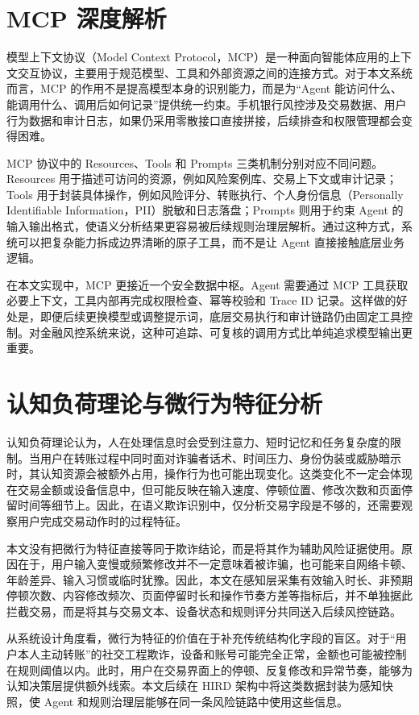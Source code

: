 \documentclass{xduugthesis}
\begin{document}
\section{MCP 深度解析}
模型上下文协议（Model Context Protocol，MCP）是一种面向智能体应用的上下文交互协议，主要用于规范模型、工具和外部资源之间的连接方式。对于本文系统而言，MCP 的作用不是提高模型本身的识别能力，而是为“Agent 能访问什么、能调用什么、调用后如何记录”提供统一约束。手机银行风控涉及交易数据、用户行为数据和审计日志，如果仍采用零散接口直接拼接，后续排查和权限管理都会变得困难。

MCP 协议中的 Resources、Tools 和 Prompts 三类机制分别对应不同问题。Resources 用于描述可访问的资源，例如风险案例库、交易上下文或审计记录；Tools 用于封装具体操作，例如风险评分、转账执行、个人身份信息（Personally Identifiable Information，PII）脱敏和日志落盘；Prompts 则用于约束 Agent 的输入输出格式，使语义分析结果更容易被后续规则治理层解析。通过这种方式，系统可以把复杂能力拆成边界清晰的原子工具，而不是让 Agent 直接接触底层业务逻辑。

在本文实现中，MCP 更接近一个安全数据中枢。Agent 需要通过 MCP 工具获取必要上下文，工具内部再完成权限检查、幂等校验和 Trace ID 记录。这样做的好处是，即便后续更换模型或调整提示词，底层交易执行和审计链路仍由固定工具控制。对金融风控系统来说，这种可追踪、可复核的调用方式比单纯追求模型输出更重要。

\section{认知负荷理论与微行为特征分析}
认知负荷理论认为，人在处理信息时会受到注意力、短时记忆和任务复杂度的限制\cite{sweller1988cognitive}。当用户在转账过程中同时面对诈骗者话术、时间压力、身份伪装或威胁暗示时，其认知资源会被额外占用，操作行为也可能出现变化\cite{ibraheem2025duress}。这类变化不一定会体现在交易金额或设备信息中，但可能反映在输入速度、停顿位置、修改次数和页面停留时间等细节上。因此，在语义欺诈识别中，仅分析交易字段是不够的，还需要观察用户完成交易动作时的过程特征。

本文没有把微行为特征直接等同于欺诈结论，而是将其作为辅助风险证据使用。原因在于，用户输入变慢或频繁修改并不一定意味着被诈骗，也可能来自网络卡顿、年龄差异、输入习惯或临时犹豫。因此，本文在感知层采集有效输入时长、非预期停顿次数、内容修改频次、页面停留时长和操作节奏方差等指标后，并不单独据此拦截交易，而是将其与交易文本、设备状态和规则评分共同送入后续风控链路。

从系统设计角度看，微行为特征的价值在于补充传统结构化字段的盲区。对于“用户本人主动转账”的社交工程欺诈，设备和账号可能完全正常，金额也可能被控制在规则阈值以内。此时，用户在交易界面上的停顿、反复修改和异常节奏，能够为认知决策层提供额外线索。本文后续在 HIRD 架构中将这类数据封装为感知快照，使 Agent 和规则治理层能够在同一条风险链路中使用这些信息。
\end{document}
